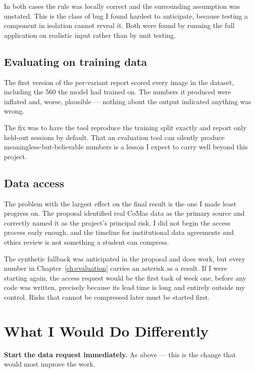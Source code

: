 \documentclass[12pt,oneside]{report}
\begin{document}
In both cases the rule was locally correct and the surrounding assumption was
unstated. This is the class of bug I found hardest to anticipate, because
testing a component in isolation cannot reveal it. Both were found by running
the full application on realistic input rather than by unit testing.

\subsection{Evaluating on training data}

The first version of the per-variant report scored every image in the dataset,
including the 560 the model had trained on. The numbers it produced were
inflated and, worse, plausible --- nothing about the output indicated anything
was wrong.

The fix was to have the tool reproduce the training split exactly and report
only held-out sessions by default. That an evaluation tool can silently produce
meaningless-but-believable numbers is a lesson I expect to carry well beyond
this project.

\subsection{Data access}

The problem with the largest effect on the final result is the one I made least
progress on. The proposal identified real CoMas data as the primary source and
correctly named it as the project's principal risk. I did not begin the access
process early enough, and the timeline for institutional data agreements and
ethics review is not something a student can compress.

The synthetic fallback was anticipated in the proposal and does work, but every
number in Chapter~\ref{ch:evaluation} carries an asterisk as a result. If I
were starting again, the access request would be the first task of week one,
before any code was written, precisely because its lead time is long and
entirely outside my control. Risks that cannot be compressed later must be
started first.

\section{What I Would Do Differently}
\label{sec:differently}

\textbf{Start the data request immediately.} As above --- this is the change
that would most improve the work.
\end{document}
